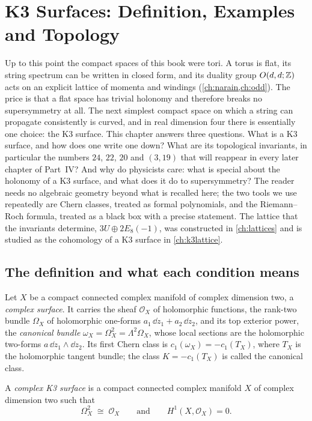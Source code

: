 \chapter{K3 Surfaces: Definition, Examples and Topology}\label{ch:k3}

Up to this point the compact spaces of this book were tori. A torus is flat, its string spectrum
can be written in closed form, and its duality group $O(d,d;\mathbb{Z})$ acts on an explicit lattice of
momenta and windings (\cref{ch:narain,ch:odd}). The price is that a flat space has trivial
holonomy and therefore breaks no supersymmetry at all. The next simplest compact space on which a
string can propagate consistently is curved, and in real dimension four there is essentially one
choice: the K3 surface. This chapter answers three questions. What is a K3
surface, and how does one write one down? What are its topological invariants, in particular
the numbers $24$, $22$, $20$ and $(3,19)$ that will reappear in every later chapter of Part~IV?
And why do physicists care: what is special about the holonomy of a K3 surface, and what does it
do to supersymmetry? The reader needs no algebraic geometry beyond what is recalled here; the
two tools we use repeatedly are Chern classes, treated as formal polynomials, and the
Riemann--Roch formula, treated as a black box with a precise statement. The lattice that the
invariants determine, $3U\oplus 2E_8(-1)$, was constructed in \cref{ch:lattices} and is studied
as the cohomology of a K3 surface in \cref{ch:k3lattice}.

\section{The definition and what each condition means}\label{sec:k3:def}

Let $X$ be a compact connected complex manifold of complex dimension two, a \emph{complex
surface}. It carries the sheaf $\mathcal{O}_X$ of holomorphic functions, the rank-two bundle
$\Omega_X$ of holomorphic one-forms $a_1\,\dd z_1+a_2\,\dd z_2$, and its top exterior power, the
\emph{canonical bundle} $\omega_X=\Omega_X^2=\Lambda^2\Omega_X$, whose
local sections are the holomorphic two-forms $a\,\dd z_1\wedge\dd z_2$. Its first Chern class
is $c_1(\omega_X)=-c_1(T_X)$, where $T_X$ is the holomorphic tangent bundle; the class
$K=-c_1(T_X)$ is called the canonical class.

\begin{definition}[K3 surface]\label{def:k3:k3}
A \emph{complex K3 surface} is a compact connected complex manifold $X$ of complex dimension two
such that
\begin{equation}\label{eq:k3:def}
  \Omega_X^2\;\cong\;\mathcal{O}_X
  \qquad\text{and}\qquad
  H^1(X,\mathcal{O}_X)=0 .
\end{equation}
\end{definition}

